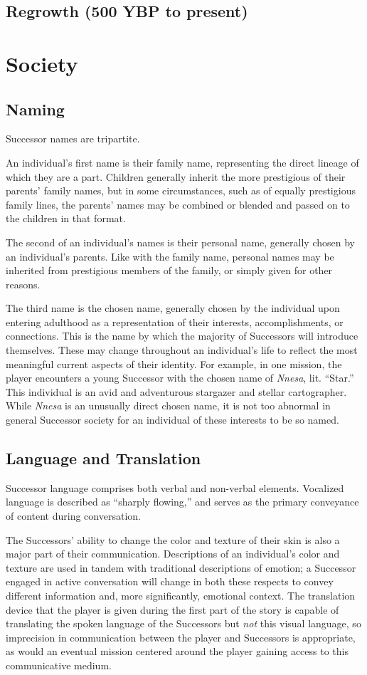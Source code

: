 \documentclass[11pt]{report}
\begin{document}
    \subsection{Regrowth (500 YBP to present)}
    \section{Society}
    \subsection{Naming}
    Successor names are tripartite.
    
    An individual's first name is their family name, representing the direct lineage of which they are a part. Children generally inherit the more prestigious of their parents' family names, but in some circumstances, such as of equally prestigious family lines, the parents' names may be combined or blended and passed on to the children in that format.

    The second of an individual's names is their personal name, generally chosen by an individual's parents. Like with the family name, personal names may be inherited from prestigious members of the family, or simply given for other reasons.

    The third name is the chosen name, generally chosen by the individual upon entering adulthood as a representation of their interests, accomplishments, or connections. This is the name by which the majority of Successors will introduce themselves. These may change throughout an individual's life to reflect the most meaningful current aspects of their identity. For example, in one mission, the player encounters a young Successor with the chosen name of \emph{Nnesa}, lit. ``Star.'' This individual is an avid and adventurous stargazer and stellar cartographer. While \emph{Nnesa} is an unusually direct chosen name, it is not too abnormal in general Successor society for an individual of these interests to be so named.

    \subsection{Language and Translation}

    Successor language comprises both verbal and non-verbal elements. Vocalized language is described as ``sharply flowing,'' and serves as the primary conveyance of content during conversation. 

    The Successors' ability to change the color and texture of their skin is also a major part of their communication. Descriptions of an individual's color and texture are used in tandem with traditional descriptions of emotion; a Successor engaged in active conversation will change in both these respects to convey different information and, more significantly, emotional context. The translation device that the player is given during the first part of the story is capable of translating the spoken language of the Successors but \emph{not} this visual language, so imprecision in communication between the player and Successors is appropriate, as would an eventual mission centered around the player gaining access to this communicative medium.
\end{document}
